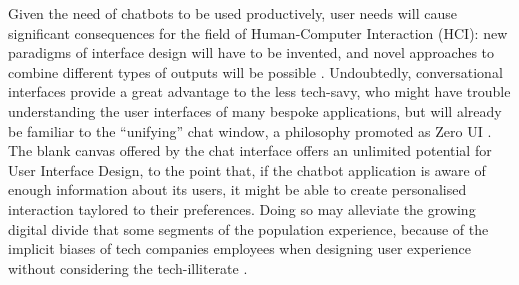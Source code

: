Given the need of chatbots to be used productively, user needs will cause significant consequences for the field of Human-Computer Interaction (HCI): new paradigms of interface design will have to be invented, and novel approaches to combine different types of outputs will be possible \cite{Følstad2017}. Undoubtedly, conversational interfaces provide a great advantage to the less tech-savy, who might have trouble understanding the user interfaces of many bespoke applications, but will already be familiar to the ``unifying'' chat window, a philosophy promoted as Zero UI \cite{zeroui}. The blank canvas offered by the chat interface offers an unlimited potential for User Interface Design, to the point that, if the chatbot application is aware of enough information about its users, it might be able to create personalised interaction taylored to their preferences. Doing so may alleviate the growing digital divide that some segments of the population experience, because of the implicit biases of tech companies employees when designing user experience without considering the tech-illiterate \cite{Brandtzaeg2011}.
